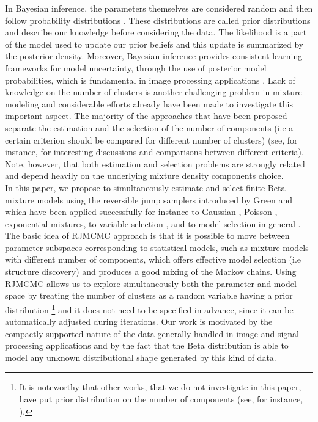 \documentclass[journal,10pt]{elsart}
\begin{document}
In Bayesian inference, the parameters themselves are considered random and then follow probability distributions \cite{Robert2007}.
These distributions are called prior distributions and describe our knowledge before considering the data.
The likelihood is a part of the model used to update our prior beliefs and this update is summarized by the posterior density.
Moreover, Bayesian inference provides consistent learning frameworks for model uncertainty, through the use of posterior model probabilities, which is fundamental in image processing applications \cite{Wilson1984}.
Lack of knowledge on the number of clusters is another challenging problem in mixture modeling and considerable efforts already have been made to investigate this important aspect.
The majority of the approaches that have been proposed separate the estimation and the selection of the number of components (i.e a certain criterion should be compared for different number of clusters) (see, for instance,\cite{McLachlan2000,BouguilaPAMI2007} for interesting discussions and comparisons between different criteria).
Note, however, that both estimation and selection problems are strongly related and depend heavily on the underlying mixture density components choice. \\
In this paper, we propose to simultaneously estimate and select finite Beta mixture models using the reversible jump samplers
introduced by Green \cite{Green1995} and which have been applied successfully for instance to Gaussian
\cite{Green1997,Marrs1997,Zhang2004,Dellaportas2006}, Poisson \cite{Viallefont2002,Meligkotsidou2007},
exponential \cite{Robert1999} mixtures, to variable selection \cite{Petros2002}, and to model selection in general \cite{Andrieu1999,Brooks2001}.
The basic idea of RJMCMC approach is that it is possible to move between parameter subspaces corresponding to statistical models, such as mixture models with different number of components, which offers effective model selection (i.e structure discovery) and produces a good mixing of the Markov chains.
Using RJMCMC allows us to explore simultaneously both the parameter and model space by treating the number of clusters as a random variable having a prior distribution \footnote{It is noteworthy that other works, that we do not investigate in this paper, have put prior distribution on the number of components (see, for instance, \cite{Roeder1997,Stephens2000Annals,Nobile2004,Nobile2007}).}
and it does not need to be specified in advance, since it can be automatically adjusted during iterations.
Our work is motivated by the compactly supported nature of the data generally handled in image and signal processing applications and by the fact that the Beta distribution is able to model any unknown distributional shape generated by this kind of data.
\end{document}
